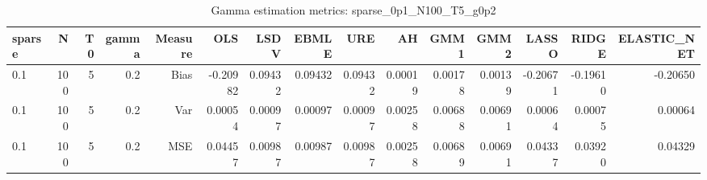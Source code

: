 \begin{table}[!htbp]\centering
\caption{Gamma estimation metrics: sparse_0p1_N100_T5_g0p2}
\label{tab:table1_sparse_0p1_N100_T5_g0p2}
\begin{tabular}{lrrrrrrrrrrrrrr}
\hline
sparse & N & T0 & gamma & Measure & OLS & LSDV & EBMLE & URE & AH & GMM1 & GMM2 & LASSO & RIDGE & ELASTIC_NET \\
\hline
0.1 & 100 & 5 & 0.2 & Bias & -0.20982 & 0.09432 & 0.09432 & 0.09432 & 0.00019 & 0.00178 & 0.00139 & -0.20671 & -0.19610 & -0.20650 \\
0.1 & 100 & 5 & 0.2 & Var & 0.00054 & 0.00097 & 0.00097 & 0.00097 & 0.00258 & 0.00688 & 0.00691 & 0.00064 & 0.00075 & 0.00064 \\
0.1 & 100 & 5 & 0.2 & MSE & 0.04457 & 0.00987 & 0.00987 & 0.00987 & 0.00258 & 0.00689 & 0.00691 & 0.04337 & 0.03920 & 0.04329 \\
\hline
\end{tabular}
\end{table}

